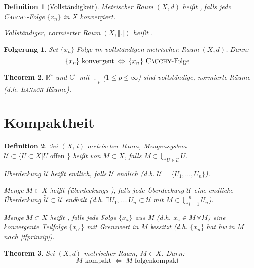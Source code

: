 \documentclass[ngerman,a4paper]{report}
\theoremstyle{break}
\newtheorem{theorem}{Theorem}[section]
\newtheorem*{definition}{Definition}
\newtheorem{conclusion}[theorem]{Folgerung}
\newcommand{\person}[1]{\textsc{#1}}
\newcommand{\highlight}[1]{\emph{#1}}
\begin{document}
\begin{definition}[Vollständigkeit]
	Metrischer Raum $(X,d)$ heißt , falls jede \person{Cauchy}-Folge $\{x_n\}$ in $X$ konvergiert.
	
	Vollständiger, normierter Raum $(X,\Vert .\Vert)$ heißt \begriff{\person{Banach}-Raum}.
\end{definition}
\begin{conclusion}
	Sei $\{x_n\}$ Folge im vollständigen metrischen Raum $(X,d)$. Dann:\[ \{x_n\}\text{ konvergent}\;\Leftrightarrow\; \{x_n\} \text{ \person{Cauchy}-Folge} \]
\end{conclusion}
\begin{theorem}
	$\mathbb{R}^n$ und $\mathbb{C}^n$ mit $|.|_p$ ($1\le p \le \infty$) sind vollständige, normierte Räume (d.h. \person{Banach}-Räume).
\end{theorem}

\section{Kompaktheit}
\begin{definition}
Sei $(X,d)$ metrischer Raum, Mengensystem $\mathcal{U}\subset \{ U\subset X | U \text{ offen }\}$ heißt  von $M\subset X$, falls $M\subset \bigcup_{U\in\mathcal{U}} U$.

Überdeckung $\mathcal{U}$ heißt endlich, falls $\mathcal{U}$ endlich (d.h. $\mathcal{U} = \{U_1,\dotsc,U_n\}$).

Menge $M\subset X$ heißt \highlight{(überdeckungs-)}, falls jede Überdeckung $\mathcal{U}$ eine endliche Überdeckung $\tilde{\mathcal{U}}\subset \mathcal{U}$ endhält (d.h. $\exists U_1,\dotsc, U_n\subset\mathcal{U}$ mit $M\subset\bigcup_{i=1}^n U_n$).

Menge $M\subset X$ heißt , falls jede Folge $\{x_n\}$ aus $M$ (d.h. $x_n\in M\,\forall M$) eine konvergente Teilfolge $\{x_{n'}\}$ mit Grenzwert in $M$ bessitzt (d.h. $\{x_n\}$ hat \gls{hw} in $M$ nach \ref{tfprinzip}).
\end{definition}

\begin{theorem}
	Sei $(X,d)$ metrischer Raum, $M\subset X$. Dann:\[M\text{ kompakt} \;\Leftrightarrow\; M\text{ folgenkompakt}\]
\end{theorem}
\end{document}
